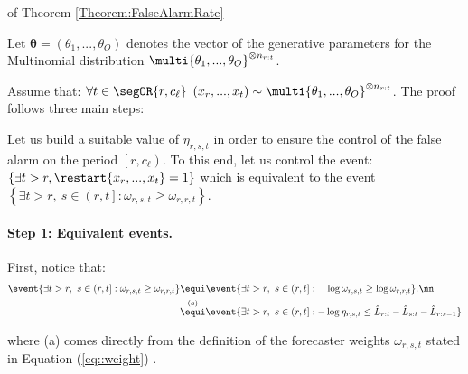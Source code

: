 \documentclass{article} %
\begin{document}
\begin{myproof}{of Theorem \ref{Theorem:FalseAlarmRate}}

Let $ \boldsymbol{\theta}  = \left(\theta_1,..., \theta_O \right)$ denotes the vector of the generative parameters for the Multinomial distribution $\multi{\theta_1,..., \theta_O}^{\otimes n_{r:t}}$.


Assume that: $ \forall t \in \segOR{r, c_\ell} \ \left(x_r, ..., x_t\right) \sim \multi{\theta_1,..., \theta_O}^{\otimes n_{r:t}}$. The proof follows three  main steps:

	
	Let us build a suitable value of $\eta_{r,s,t}$ in order to ensure the control of the false alarm on the period $\left[r, c_\ell \right)$.
	To this end, let us control the event: $ \left\lbrace \exists t>r,  \restart{x_r,...,x_t} = 1 \right\rbrace$ which is equivalent to the event $ \left\lbrace \exists  t>r, \ s \in \left(r,t \right]: \omega_{r,s,t} \geq \omega_{r,r,t} \right\rbrace$.


\paragraph{Step 1: Equivalent events.}
	First, notice that:
	\begin{align}
	\event{ \exists  t>r, \ s \in \left(r,t \right]: \omega_{r,s,t} \geq \omega_{r,r,t} } & \equi \event{\exists  t>r, \ s \in \left(r,t \right]: \quad \log \omega_{r,s,t} \geq \log \omega_{r,r,t}}. \nn \\
	 &  \overset{(a)}{\equi} \event{ \exists  t>r, \ s \in \left(r,t \right]:- \log \eta_{r,s,t} \leq  
	\hat{L}_{r:t} - \hat{L}_{s:t} - \hat{L}_{r:s-1} } \label{Eq::Equiv}  
	\end{align}
	
	where (a) comes directly from the definition of the forecaster weights $\omega_{r,s,t}$ stated in  Equation (\ref{eq::weight}) .



\end{myproof}
\end{document}

